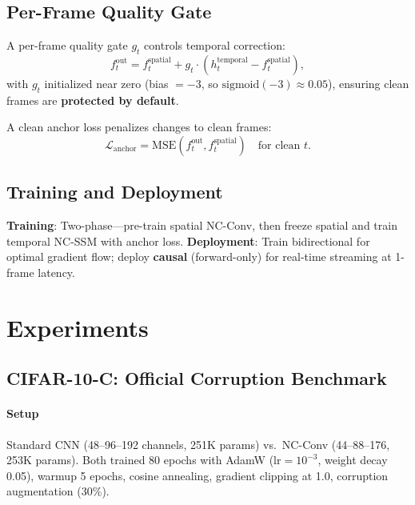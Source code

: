 \documentclass[journal]{IEEEtran}
\begin{document}
\subsection{Per-Frame Quality Gate}

A per-frame quality gate $g_t$ controls temporal correction:
\begin{equation}
f_t^{\text{out}} = f_t^{\text{spatial}} + g_t \cdot (h_t^{\text{temporal}} - f_t^{\text{spatial}}),
\end{equation}
with $g_t$ initialized near zero (bias $= -3$, so $\text{sigmoid}(-3) \approx 0.05$), ensuring clean frames are \textbf{protected by default}.

A clean anchor loss penalizes changes to clean frames:
\begin{equation}
\mathcal{L}_{\text{anchor}} = \text{MSE}(f_t^{\text{out}}, f_t^{\text{spatial}}) \quad \text{for clean } t.
\end{equation}

\subsection{Training and Deployment}
\textbf{Training}: Two-phase---pre-train spatial NC-Conv, then freeze spatial and train temporal NC-SSM with anchor loss.
\textbf{Deployment}: Train bidirectional for optimal gradient flow; deploy \textbf{causal} (forward-only) for real-time streaming at 1-frame latency.


\section{Experiments}
\label{sec:experiments}

\subsection{CIFAR-10-C: Official Corruption Benchmark}
\label{sec:cifar10c}

\paragraph{Setup}
Standard CNN (48--96--192 channels, 251K params) vs.\ NC-Conv (44--88--176, 253K params).
Both trained 80 epochs with AdamW ($\text{lr}=10^{-3}$, weight decay 0.05), warmup 5 epochs, cosine annealing, gradient clipping at 1.0, corruption augmentation (30\%).
\end{document}
